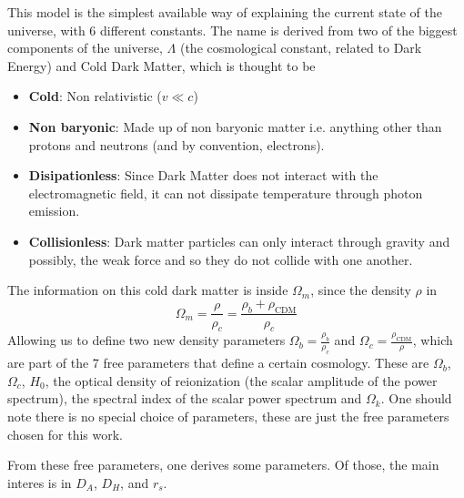 This model is the simplest available way of explaining the current state of the universe, with 6 different constants. The name is derived from two of the biggest components of the universe, $\Lambda$ (the cosmological constant, related to Dark Energy) and Cold Dark Matter, which is thought to be
\begin{itemize}
	\item \textbf{Cold}: Non relativistic ($v \ll c$)
	\item \textbf{Non baryonic}: Made up of non baryonic matter i.e. anything other than protons and neutrons (and by convention, electrons).
	\item \textbf{Disipationless}: Since Dark Matter does not interact with the electromagnetic field, it can not dissipate temperature through photon emission.
	\item \textbf{Collisionless}: Dark matter particles can only interact through gravity and possibly, the weak force and so they do not collide with one another.
\end{itemize}
The information on this cold dark matter is inside $\Omega_m$, since the density $\rho$ in $$\Omega_m = \frac{\rho}{\rho_c} = \frac{\rho_b + \rho_{\text{CDM}}}{\rho_c}$$
Allowing us to define two new density parameters $\Omega_b = \frac{\rho_b}{\rho_c}$ and $\Omega_c =  \frac{\rho_\text{CDM}}{\rho}$, which are part of the 7 free parameters that define a certain cosmology. These are $\Omega_b$, $\Omega_c$, $H_0$, the optical density of reionization (the scalar amplitude of the power spectrum), the spectral index of the scalar power spectrum and $\Omega_k$. One should note there is no special choice of parameters, these are just the free parameters chosen for this work.

From these free parameters, one derives some parameters. Of those, the main interes is in $D_A$, $D_H$, and $r_s$.

